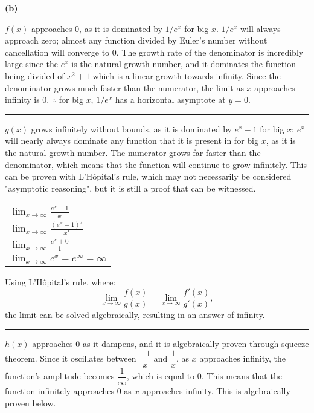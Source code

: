 \documentclass[answers,addpoints]{exam}
\begin{document}
\begin{questions}
\begin{solution}
      \textbf{(b)}

      $f(x)$ approaches $0$, as it is dominated by $1/e^x$ for big $x$. $1/e^x$ will always approach zero; almost any function divided by Euler’s number without cancellation will converge to $0$. The growth rate of the denominator is incredibly large since the $e^x$ is the natural growth number, and it dominates the function being divided of $x^2 + 1$ which is a linear growth towards infinity. Since the denominator grows much faster than the numerator, the limit as $x$ approaches infinity is $0$. $\therefore$ for big $x$, $1/e^x$ has a horizontal asymptote at $y=0$.

      \hrule

      $g(x)$ grows infinitely without bounds, as it is dominated by $e^x - 1$ for big $x$; $e^x$ will nearly always dominate any function that it is present in for big $x$, as it is the natural growth number. The numerator grows far faster than the denominator, which means that the function will continue to grow infinitely. This can be proven with L’Hôpital’s rule, which may not necessarily be considered "asymptotic reasoning", but it is still a proof that can be witnessed.

      \begin{center}
        \begin{tabular}{@{}l@{}}
          $\displaystyle \lim_{x \to \infty}\frac{e^x-1}{x}$ \\[6pt]
          $\displaystyle \lim_{x \to \infty} \frac{(e^x-1)'}{x'}$ \\[6pt]
          $\displaystyle \lim_{x \to \infty} \frac{e^x+0}{1}$ \\[6pt]
          $\displaystyle \lim_{x \to \infty} e^x = e^\infty = \infty$
        \end{tabular}
      \end{center}

      Using L’Hôpital’s rule, where:
      \[
        \lim_{x \to \infty} \frac{f(x)}{g(x)} = \lim_{x \to \infty} \frac{f'(x)}{g'(x)},
      \]
      the limit can be solved algebraically, resulting in an answer of infinity.

      \hrule

      $h(x)$ approaches $0$ as it dampens, and it is algebraically proven through squeeze theorem. Since it oscillates between $\dfrac{-1}{x}$ and $\dfrac{1}{x}$, as $x$ approaches infinity, the function’s amplitude becomes $\dfrac{1}{\infty}$, which is equal to $0$. This means that the function infinitely approaches $0$ as $x$ approaches infinity. This is algebraically proven below.


\end{solution}
\end{questions}
\end{document}
